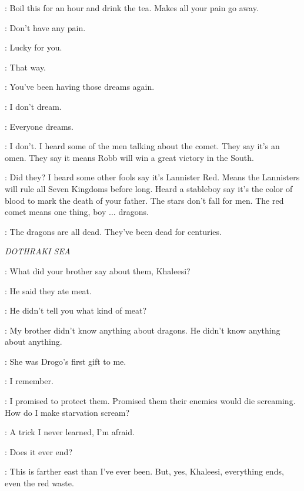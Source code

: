 
\OSHA:  Boil this for an hour and drink the tea. Makes all your pain go away.

\BRAN: Don't have any pain.

\OSHA: Lucky for you.

\BRAN:  That way.

\OSHA: You've been having those dreams again.

\BRAN: I don't dream.

\OSHA: Everyone dreams.

\BRAN: I don't. I heard some of the men talking about the comet. They say it's an omen. They say it means Robb will win a great victory in the South.

\OSHA: Did they? I heard some other fools say it's Lannister Red. Means the Lannisters will rule all Seven Kingdoms before long. Heard a stableboy say it's the color of blood to mark the death of your father. The stars don't fall for men. The red comet means one thing, boy $\ldots$ dragons.

\BRAN: The dragons are all dead. They've been dead for centuries.


\scene

\textit{DOTHRAKI SEA}


\DOREAH: What did your brother say about them, Khaleesi?

\DAENERYS: He said they ate meat.

\DOREAH: He didn't tell you what kind of meat?

\DAENERYS: My brother didn't know anything about dragons. He didn't know anything about anything.


\DAENERYS: She was Drogo's first gift to me.

\JORAH: I remember.

\DAENERYS: I promised to protect them. Promised them their enemies would die screaming. How do I make starvation scream?

\JORAH: A trick I never learned, I'm afraid.

\DAENERYS: Does it ever end?

\JORAH: This is farther east than I've ever been. But, yes, Khaleesi, everything ends, even the red waste.

